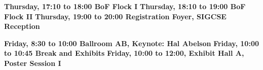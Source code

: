 \noindent
{\sffamily\bfseries Thursday, 17:10 to 18:00  BoF Flock I}\newline\noindent 
{\sffamily\bfseries Thursday, 18:10 to 19:00 BoF Flock II}\newline\noindent
{\sffamily\bfseries Thursday, 19:00 to 20:00 Registration Foyer, SIGCSE Reception}\newline\noindent



%
%
\noindent
{\sffamily\bfseries Friday, 8:30 to 10:00 Ballroom AB, Keynote: Hal Abelson}\newline\noindent
{\sffamily\bfseries Friday, 10:00 to 10:45 Break and Exhibits}\newline\noindent
{\sffamily\bfseries Friday, 10:00 to 12:00, Exhibit Hall A, Poster Session I}\newline\noindent




